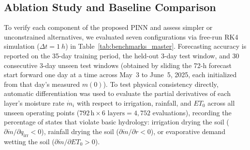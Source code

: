 \documentclass[pdflatex,sn-nature]{sn-jnl}%
\theoremstyle{thmstyleone}%
\theoremstyle{thmstyletwo}%
\theoremstyle{thmstylethree}%
\begin{document}
{\color{blue}\subsection{Ablation Study and Baseline Comparison}\label{sec:benchmarks}

To verify each component of the proposed PINN and assess simpler or unconstrained alternatives, we evaluated seven configurations via free-run RK4 simulation ($\Delta t = \SI{1}{h}$) in Table~\ref{tab:benchmarks_master}. Forecasting accuracy is reported on the 35-day training period, the held-out 3-day test window, and 30 consecutive 3-day unseen test windows (obtained by sliding the 72-h forecast start forward one day at a time across May~3 to June~5, 2025, each initialized from that day's measured $m(0)$). To test physical consistency directly, automatic differentiation was used to evaluate the partial derivatives of each layer's moisture rate $\dot{m}_i$ with respect to irrigation, rainfall, and $ET_0$ across all unseen operating points ($792\,\mathrm{h} \times 6\text{ layers} = 4{,}752$ evaluations), recording the percentage of states that violate basic hydrology: irrigation drying the soil ($\partial \dot{m}/\partial q_{\mathrm{irr}} < 0$), rainfall drying the soil ($\partial \dot{m}/\partial r < 0$), or evaporative demand wetting the soil ($\partial \dot{m}/\partial ET_0 > 0$).

}
\end{document}
